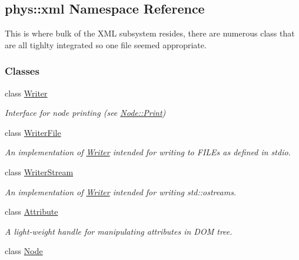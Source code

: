 \hypertarget{namespacephys_1_1xml}{
\subsection{phys::xml Namespace Reference}
\label{d9/d27/namespacephys_1_1xml}
}


This is where bulk of the XML subsystem resides, there are numerous class that are all tighlty integrated so one file seemed appropriate.  


\subsubsection*{Classes}
\begin{DoxyCompactItemize}
\item 
class \hyperlink{classphys_1_1xml_1_1Writer}{Writer}
\begin{DoxyCompactList}\small\item\em Interface for node printing (see \hyperlink{classphys_1_1xml_1_1Node_adbe10968a804a94552e1dc8223744406}{Node::Print}) \item\end{DoxyCompactList}\item 
class \hyperlink{classphys_1_1xml_1_1WriterFile}{WriterFile}
\begin{DoxyCompactList}\small\item\em An implementation of \hyperlink{classphys_1_1xml_1_1Writer}{Writer} intended for writing to FILEs as defined in stdio. \item\end{DoxyCompactList}\item 
class \hyperlink{classphys_1_1xml_1_1WriterStream}{WriterStream}
\begin{DoxyCompactList}\small\item\em An implementation of \hyperlink{classphys_1_1xml_1_1Writer}{Writer} intended for writing std::ostreams. \item\end{DoxyCompactList}\item 
class \hyperlink{classphys_1_1xml_1_1Attribute}{Attribute}
\begin{DoxyCompactList}\small\item\em A light-\/weight handle for manipulating attributes in DOM tree. \item\end{DoxyCompactList}\item 
class \hyperlink{classphys_1_1xml_1_1Node}{Node}

\end{DoxyCompactItemize}
